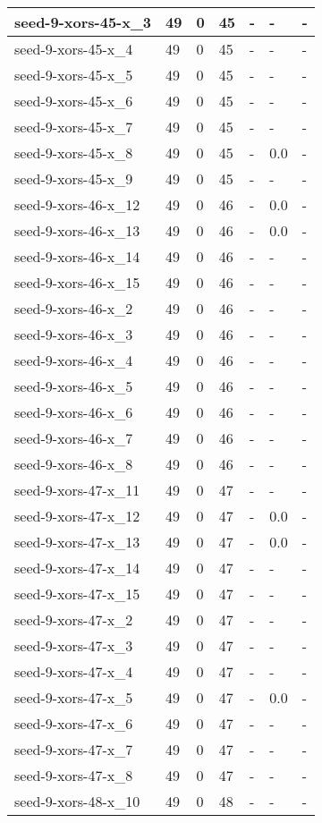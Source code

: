 \begin{scriptsize}
\begin{longtable}{|p{5cm}|l|l|l|l|l|l|}
seed-9-xors-45-x\_3&49&0&45&-&-&- \\ \hline 
seed-9-xors-45-x\_4&49&0&45&-&-&- \\ \hline 
seed-9-xors-45-x\_5&49&0&45&-&-&- \\ \hline 
seed-9-xors-45-x\_6&49&0&45&-&-&- \\ \hline 
seed-9-xors-45-x\_7&49&0&45&-&-&- \\ \hline 
seed-9-xors-45-x\_8&49&0&45&-&0.0&- \\ \hline 
seed-9-xors-45-x\_9&49&0&45&-&-&- \\ \hline 
seed-9-xors-46-x\_12&49&0&46&-&0.0&- \\ \hline 
seed-9-xors-46-x\_13&49&0&46&-&0.0&- \\ \hline 
seed-9-xors-46-x\_14&49&0&46&-&-&- \\ \hline 
seed-9-xors-46-x\_15&49&0&46&-&-&- \\ \hline 
seed-9-xors-46-x\_2&49&0&46&-&-&- \\ \hline 
seed-9-xors-46-x\_3&49&0&46&-&-&- \\ \hline 
seed-9-xors-46-x\_4&49&0&46&-&-&- \\ \hline 
seed-9-xors-46-x\_5&49&0&46&-&-&- \\ \hline 
seed-9-xors-46-x\_6&49&0&46&-&-&- \\ \hline 
seed-9-xors-46-x\_7&49&0&46&-&-&- \\ \hline 
seed-9-xors-46-x\_8&49&0&46&-&-&- \\ \hline 
seed-9-xors-47-x\_11&49&0&47&-&-&- \\ \hline 
seed-9-xors-47-x\_12&49&0&47&-&0.0&- \\ \hline 
seed-9-xors-47-x\_13&49&0&47&-&0.0&- \\ \hline 
seed-9-xors-47-x\_14&49&0&47&-&-&- \\ \hline 
seed-9-xors-47-x\_15&49&0&47&-&-&- \\ \hline 
seed-9-xors-47-x\_2&49&0&47&-&-&- \\ \hline 
seed-9-xors-47-x\_3&49&0&47&-&-&- \\ \hline 
seed-9-xors-47-x\_4&49&0&47&-&-&- \\ \hline 
seed-9-xors-47-x\_5&49&0&47&-&0.0&- \\ \hline 
seed-9-xors-47-x\_6&49&0&47&-&-&- \\ \hline 
seed-9-xors-47-x\_7&49&0&47&-&-&- \\ \hline 
seed-9-xors-47-x\_8&49&0&47&-&-&- \\ \hline 
seed-9-xors-48-x\_10&49&0&48&-&-&- \\ \hline 

\end{longtable}
\end{scriptsize}
